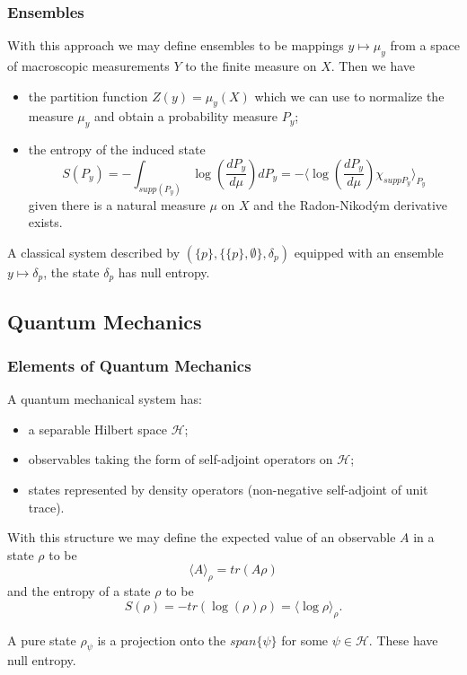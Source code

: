 \documentclass{beamer}
\theoremstyle{definition}
\begin{document}
\begin{frame}

\frametitle{Ensembles}

With this approach we may define ensembles to be mappings $y\mapsto\mu_y$ from a space of macroscopic measurements $Y$ to the finite measure on $X$. Then we have
\begin{itemize}
\item the partition function $Z(y)=\mu_y(X)$ which we can use to normalize the measure $\mu_y$ and obtain a probability measure $P_y$;
\item the entropy of the induced state
\begin{equation}
S(P_y)=-\int_{supp(P_y)} \log\left(\frac{dP_y}{d\mu}\right)dP_y=-\langle\log\left(\frac{dP_y}{d\mu}\right)\chi_{supp P_y}\rangle_{P_y}
\end{equation}
given there is a natural measure $\mu$ on $X$ and the Radon-Nikodým derivative exists. 
\end{itemize}

A classical system described by $(\{p\},\{\{p\},\emptyset\},\delta_p)$ equipped with an ensemble $y\mapsto \delta_p$, the state $\delta_p$ has null entropy.

\end{frame}

\subsection{Quantum Mechanics}

\begin{frame}

\frametitle{Elements of Quantum Mechanics}

A quantum mechanical system has:

\begin{itemize}
\item a separable Hilbert space $\mathcal{H}$;
\item observables taking the form of self-adjoint operators on $\mathcal{H}$;
\item states represented by density operators (non-negative self-adjoint of unit trace).
\end{itemize}

With this structure we may define the expected value of an observable $A$ in a state $\rho$ to be
\begin{equation}
\langle A \rangle_\rho = tr(A\rho)
\end{equation}
and the entropy of a state $\rho$ to be
\begin{equation}
S(\rho) = -tr(\log(\rho)\rho)=\langle\log\rho\rangle_\rho.
\end{equation}

A pure state $\rho_\psi$ is a projection onto the $span\{\psi\}$ for some $\psi\in\mathcal{H}$. These have null entropy.

\end{frame}
\end{document}
